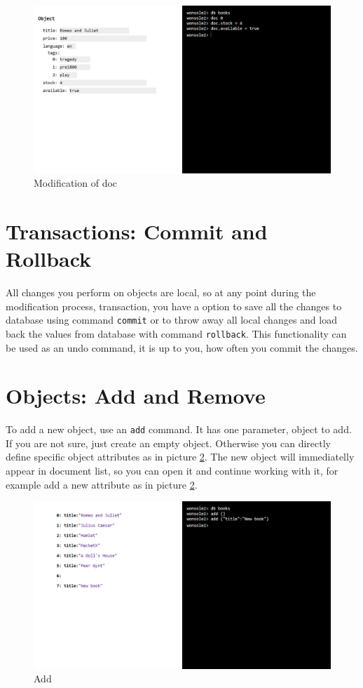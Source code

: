 \documentclass[10pt,a4paper,oneside]{report}
\begin{document}
\begin{figure}
\centering
\includegraphics[width=\textwidth]{screenshot/wonsole2/wonsole2-38.png}
\caption{Modification of doc}
\label{wonsole2-38}
\end{figure}



\section{Transactions: Commit and Rollback}
All changes you perform on objects are local, so at any point during the
modification process, transaction, you have a option to save all the changes to
database using command \verb|commit| or to throw away all local changes and load
back the values from database with command \verb|rollback|. This functionality
can be used as an undo command, it is up to you, how often you commit the
changes.


\section{Objects: Add and Remove}
To add a new object, use an \verb|add| command. It has one parameter, object to
add. If you are not sure, just create an empty object. Otherwise you can
directly define specific object attributes as in picture \ref{wonsole2-48}. The
new object will immediatelly appear in document list, so you can open
it and continue working with it, for example add a new attribute as in picture
\ref{wonsole2-48}.


\begin{figure}
\centering
\includegraphics[width=\textwidth]{screenshot/wonsole2/wonsole2-48.png}
\caption{Add}
\label{wonsole2-48}
\end{figure}
\end{document}
